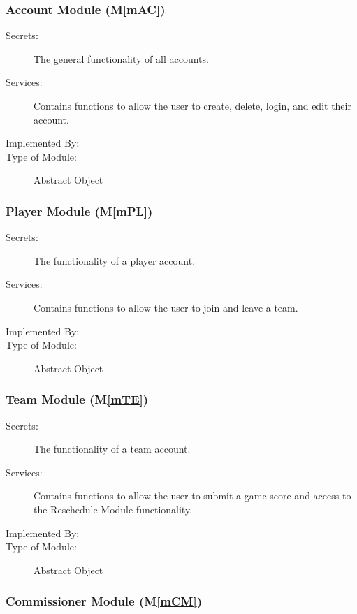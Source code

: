 \documentclass[12pt, titlepage]{article}
\newcommand{\mref}[1]{M\ref{#1}}
\begin{document}
\subsubsection{Account Module (\mref{mAC})}

\begin{description}
  \item[Secrets:]The general functionality of all accounts.
  \item[Services:]Contains functions to allow the user to create, delete,
  login, and edit their \progname{} account.
  \item[Implemented By:] \progname{}
  \item[Type of Module:] Abstract Object
\end{description}

\subsubsection{Player Module (\mref{mPL})}

\begin{description}
  \item[Secrets:]The functionality of a player account.
  \item[Services:]Contains functions to allow the user to join and leave a
  team.
  \item[Implemented By:] \progname{}
  \item[Type of Module:] Abstract Object
\end{description}

\subsubsection{Team Module (\mref{mTE})}

\begin{description}
  \item[Secrets:]The functionality of a team account.
  \item[Services:]Contains functions to allow the user to submit a game score
  and access to the Reschedule Module functionality.
  \item[Implemented By:] \progname{}
  \item[Type of Module:] Abstract Object
\end{description}

\subsubsection{Commissioner Module (\mref{mCM})}
\end{document}
